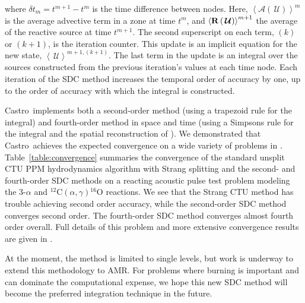 \documentclass[a4paper]{jpconf}
\newcommand{\castro}{{\sffamily Castro}}
\newcommand{\Uc}{{\,\bm{\mathcal{U}}}}
\newcommand{\Advs}[1]{\boldsymbol{\mathcal{A}} \left(#1\right)}
\newcommand{\isotm}[2]{{}^{#2}\mathrm{#1}}
\newcommand{\avg}[1]{{\left \langle #1 \right \rangle}}
\newcommand{\Rbs}[1]{{\bf R} \left ( #1 \right )}
\begin{document}
where $\delta t_m = t^{m+1} - t^m$ is the time difference between nodes.
Here, $\avg{\Advs{\Uc}}^m$ is the
average advective term in a zone at time $t^m$, and
$\avg{\Rbs{\Uc}}^{m+1}$ the average of the reactive source at time
$t^{m+1}$.  The second superscript on each term, $(k)$ or $(k+1)$, is
the iteration counter.  This update is an implicit equation for the
new state, $\avg{\Uc}^{{m+1},(k+1)}$.  The last term in the update is
an integral over the sources constructed from the previous iteration's
values at each time node.  Each iteration of the SDC method increases
the temporal order of accuracy by one, up to the order of accuracy
with which the integral is constructed.

\castro\ implements both a second-order method (using a trapezoid rule
for the integral) and fourth-order method in space and time (using a
Simpsons rule for the integral and the spatial reconstruction of
\cite{mccorquodalecolella}).  We demonstrated that \castro\ achieves
the expected convergence on a wide variety of problems in
\cite{castro:sdc}.  Table~\ref{table:convergence} summaries the
convergence of the standard unsplit CTU PPM hydrodynamics algorithm
with Strang splitting and the second- and fourth-order SDC methods on
a reacting acoustic pulse test problem modeling the 3-$\alpha$ and
$\isotm{C}{12}(\alpha,\gamma)\isotm{O}{16}$ reactions.  We see that
the Strang CTU method has trouble achieving second order accuracy,
while the second-order SDC method converges second order.  The
fourth-order SDC method converges almost fourth order overall.  Full
details of this problem and more extensive convergence results are
given in \cite{castro:sdc}.

At the moment, the method is limited to single
levels, but work is underway to extend this methodology to AMR.  For
problems where burning is important and can dominate the computational
expense, we hope this new SDC method will become the preferred
integration technique in the future.
\end{document}
